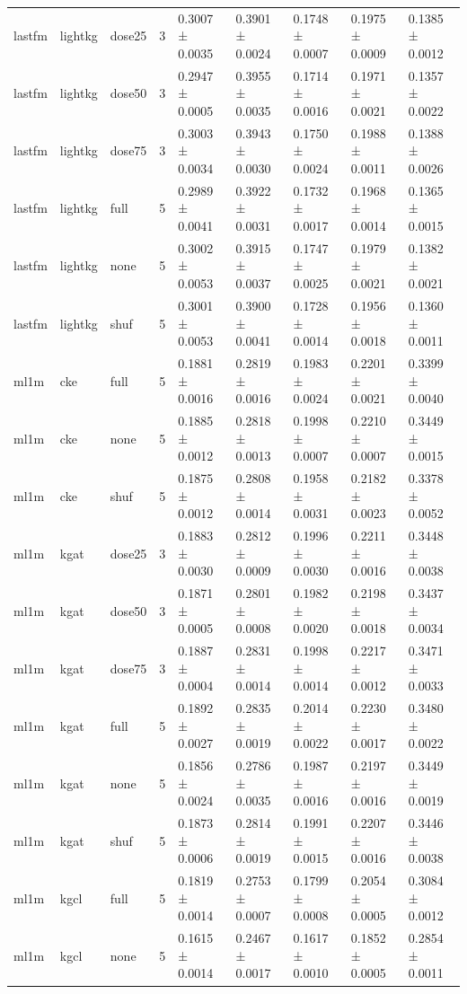 \begin{table}[t]
\begin{tabular}{lllllllll}
lastfm & lightkg & dose25 & 3 & 0.3007 ± 0.0035 & 0.3901 ± 0.0024 & 0.1748 ± 0.0007 & 0.1975 ± 0.0009 & 0.1385 ± 0.0012 \\
lastfm & lightkg & dose50 & 3 & 0.2947 ± 0.0005 & 0.3955 ± 0.0035 & 0.1714 ± 0.0016 & 0.1971 ± 0.0021 & 0.1357 ± 0.0022 \\
lastfm & lightkg & dose75 & 3 & 0.3003 ± 0.0034 & 0.3943 ± 0.0030 & 0.1750 ± 0.0024 & 0.1988 ± 0.0011 & 0.1388 ± 0.0026 \\
lastfm & lightkg & full & 5 & 0.2989 ± 0.0041 & 0.3922 ± 0.0031 & 0.1732 ± 0.0017 & 0.1968 ± 0.0014 & 0.1365 ± 0.0015 \\
lastfm & lightkg & none & 5 & 0.3002 ± 0.0053 & 0.3915 ± 0.0037 & 0.1747 ± 0.0025 & 0.1979 ± 0.0021 & 0.1382 ± 0.0021 \\
lastfm & lightkg & shuf & 5 & 0.3001 ± 0.0053 & 0.3900 ± 0.0041 & 0.1728 ± 0.0014 & 0.1956 ± 0.0018 & 0.1360 ± 0.0011 \\
ml1m & cke & full & 5 & 0.1881 ± 0.0016 & 0.2819 ± 0.0016 & 0.1983 ± 0.0024 & 0.2201 ± 0.0021 & 0.3399 ± 0.0040 \\
ml1m & cke & none & 5 & 0.1885 ± 0.0012 & 0.2818 ± 0.0013 & 0.1998 ± 0.0007 & 0.2210 ± 0.0007 & 0.3449 ± 0.0015 \\
ml1m & cke & shuf & 5 & 0.1875 ± 0.0012 & 0.2808 ± 0.0014 & 0.1958 ± 0.0031 & 0.2182 ± 0.0023 & 0.3378 ± 0.0052 \\
ml1m & kgat & dose25 & 3 & 0.1883 ± 0.0030 & 0.2812 ± 0.0009 & 0.1996 ± 0.0030 & 0.2211 ± 0.0016 & 0.3448 ± 0.0038 \\
ml1m & kgat & dose50 & 3 & 0.1871 ± 0.0005 & 0.2801 ± 0.0008 & 0.1982 ± 0.0020 & 0.2198 ± 0.0018 & 0.3437 ± 0.0034 \\
ml1m & kgat & dose75 & 3 & 0.1887 ± 0.0004 & 0.2831 ± 0.0014 & 0.1998 ± 0.0014 & 0.2217 ± 0.0012 & 0.3471 ± 0.0033 \\
ml1m & kgat & full & 5 & 0.1892 ± 0.0027 & 0.2835 ± 0.0019 & 0.2014 ± 0.0022 & 0.2230 ± 0.0017 & 0.3480 ± 0.0022 \\
ml1m & kgat & none & 5 & 0.1856 ± 0.0024 & 0.2786 ± 0.0035 & 0.1987 ± 0.0016 & 0.2197 ± 0.0016 & 0.3449 ± 0.0019 \\
ml1m & kgat & shuf & 5 & 0.1873 ± 0.0006 & 0.2814 ± 0.0019 & 0.1991 ± 0.0015 & 0.2207 ± 0.0016 & 0.3446 ± 0.0038 \\
ml1m & kgcl & full & 5 & 0.1819 ± 0.0014 & 0.2753 ± 0.0007 & 0.1799 ± 0.0008 & 0.2054 ± 0.0005 & 0.3084 ± 0.0012 \\
ml1m & kgcl & none & 5 & 0.1615 ± 0.0014 & 0.2467 ± 0.0017 & 0.1617 ± 0.0010 & 0.1852 ± 0.0005 & 0.2854 ± 0.0011 \\

\end{tabular}
\end{table}
